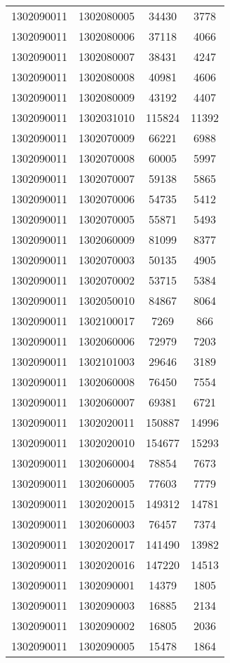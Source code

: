 \begin{longtable}[h]{llcc}
		1302090011 & 1302080005 & 34430 & 3778\\
		1302090011 & 1302080006 & 37118 & 4066\\
		1302090011 & 1302080007 & 38431 & 4247\\
		1302090011 & 1302080008 & 40981 & 4606\\
		1302090011 & 1302080009 & 43192 & 4407\\
		1302090011 & 1302031010 & 115824 & 11392\\
		1302090011 & 1302070009 & 66221 & 6988\\
		1302090011 & 1302070008 & 60005 & 5997\\
		1302090011 & 1302070007 & 59138 & 5865\\
		1302090011 & 1302070006 & 54735 & 5412\\
		1302090011 & 1302070005 & 55871 & 5493\\
		1302090011 & 1302060009 & 81099 & 8377\\
		1302090011 & 1302070003 & 50135 & 4905\\
		1302090011 & 1302070002 & 53715 & 5384\\
		1302090011 & 1302050010 & 84867 & 8064\\
		1302090011 & 1302100017 & 7269 & 866\\
		1302090011 & 1302060006 & 72979 & 7203\\
		1302090011 & 1302101003 & 29646 & 3189\\
		1302090011 & 1302060008 & 76450 & 7554\\
		1302090011 & 1302060007 & 69381 & 6721\\
		1302090011 & 1302020011 & 150887 & 14996\\
		1302090011 & 1302020010 & 154677 & 15293\\
		1302090011 & 1302060004 & 78854 & 7673\\
		1302090011 & 1302060005 & 77603 & 7779\\
		1302090011 & 1302020015 & 149312 & 14781\\
		1302090011 & 1302060003 & 76457 & 7374\\
		1302090011 & 1302020017 & 141490 & 13982\\
		1302090011 & 1302020016 & 147220 & 14513\\
		1302090011 & 1302090001 & 14379 & 1805\\
		1302090011 & 1302090003 & 16885 & 2134\\
		1302090011 & 1302090002 & 16805 & 2036\\
		1302090011 & 1302090005 & 15478 & 1864\\

\end{longtable}
